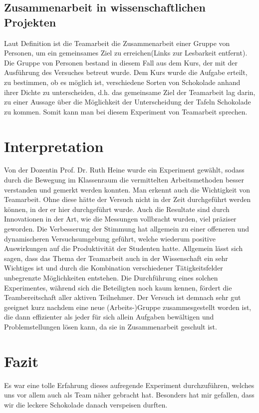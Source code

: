 \documentclass[12pt]{scrartcl}
\begin{document}
\subsection{Zusammenarbeit in wissenschaftlichen Projekten}
Laut Definition ist die Teamarbeit \glqq die Zusammenarbeit einer Gruppe von Personen, um ein gemeinsames Ziel zu erreichen\grqq \cite{Ergebnisse1}(Links zur Lesbarkeit entfernt). Die Gruppe von Personen bestand in diesem Fall aus dem Kurs, der mit der Ausführung des Versuches betreut wurde. Dem Kurs wurde die Aufgabe erteilt, zu bestimmen, ob es möglich ist, verschiedene Sorten von Schokolade anhand ihrer Dichte zu unterscheiden, d.h. das gemeinsame Ziel der Teamarbeit lag darin, zu einer Aussage über die Möglichkeit der Unterscheidung der Tafeln Schokolade zu kommen. Somit kann man bei diesem Experiment von Teamarbeit sprechen.
\section{Interpretation}
Von der Dozentin Prof. Dr. Ruth Heine wurde ein Experiment gewählt, sodass durch die Bewegung im Klassenraum die vermittelten Arbeitsmethoden besser verstanden und gemerkt werden konnten\cite {Interpretation1}. Man erkennt auch die Wichtigkeit von Teamarbeit. Ohne diese hätte der Versuch nicht in der Zeit durchgeführt werden können, in der er hier durchgeführt wurde. Auch die Resultate sind durch Innovationen in der Art, wie die Messungen vollbracht wurden, viel präziser geworden. Die Verbesserung der Stimmung hat allgemein zu einer offeneren und dynamischeren Versuchsumgebung geführt, welche wiederum positive Auswirkungen auf die Produktivität der Studenten hatte. Allgemein lässt sich sagen, dass das Thema der Teamarbeit auch in der Wissenschaft ein sehr Wichtiges ist und durch die Kombination verschiedener Tätigkeitsfelder unbegrenzte Möglichkeiten entstehen. Die Durchführung eines solchen Experimentes, während sich die Beteiligten noch kaum kennen, fördert die Teambereitschaft aller aktiven Teilnehmer. Der Versuch ist demnach sehr gut geeignet kurz nachdem eine neue (Arbeits-)Gruppe zusammesgestellt worden ist, die dann effizienter als jeder für sich allein Aufgaben bewältigen und Problemstellungen lösen kann, da sie in Zusammenarbeit geschult ist.
\section{Fazit}
Es war eine tolle Erfahrung dieses aufregende Experiment durchzuführen, welches uns vor allem auch als Team näher gebracht hat. Besonders hat mir gefallen, dass wir die leckere Schokolade danach verspeisen durften.
\end{document}
